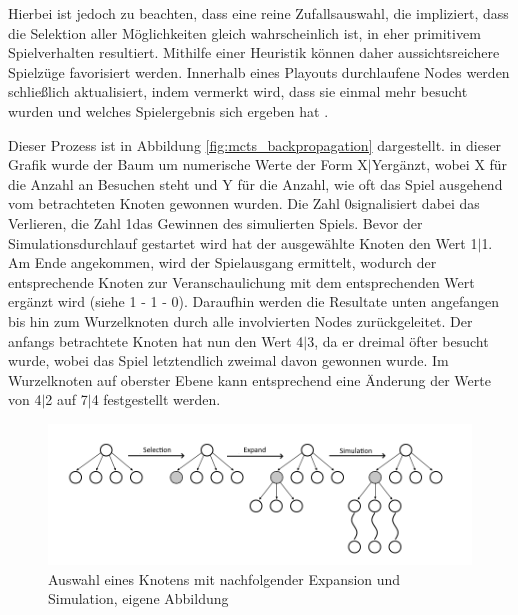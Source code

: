 \documentclass[12pt,a4paper]{article}
\begin{document}
Hierbei ist jedoch zu beachten, dass eine reine Zufallsauswahl, die impliziert, dass die Selektion aller Möglichkeiten gleich wahrscheinlich ist, in eher primitivem Spielverhalten resultiert. Mithilfe einer Heuristik können daher aussichtsreichere Spielzüge favorisiert werden. Innerhalb eines Playouts durchlaufene Nodes werden schließlich aktualisiert, indem vermerkt wird, dass sie einmal mehr besucht wurden und welches Spielergebnis sich ergeben hat \cite{Chaslot2008}.

Dieser Prozess ist in Abbildung \ref{fig:mcts_backpropagation} dargestellt. in dieser Grafik wurde der Baum um numerische Werte der Form \glqq{}X$|$Y\grqq  ergänzt, wobei X für die Anzahl an Besuchen steht und Y für die Anzahl, wie oft das Spiel ausgehend vom betrachteten Knoten gewonnen wurden. Die Zahl \glqq{}0\grqq signalisiert dabei das Verlieren, die Zahl \glqq{}1\grqq das Gewinnen des simulierten Spiels. Bevor der Simulationsdurchlauf gestartet wird hat der ausgewählte Knoten den Wert \glqq{}1$|$1\grqq{}. Am Ende angekommen, wird der Spielausgang ermittelt, wodurch der entsprechende Knoten zur Veranschaulichung mit dem entsprechenden Wert ergänzt wird (siehe \glqq{}1\grqq{} - \glqq{}1\grqq{} - \glqq{}0\grqq). Daraufhin werden die Resultate unten angefangen bis hin zum Wurzelknoten durch alle involvierten Nodes zurückgeleitet. Der anfangs betrachtete Knoten hat nun den Wert \glqq{}4$|$3\grqq{}, da er dreimal öfter besucht wurde, wobei das Spiel letztendlich zweimal davon gewonnen wurde. Im Wurzelknoten auf oberster Ebene kann entsprechend eine Änderung der Werte von \glqq{}4$|$2\grqq{} auf \glqq{}7$|$4\grqq{} festgestellt werden.

\begin{figure}
\centering
\includegraphics[width=1.0\textwidth]{pics/SelectionExpandSimulation.png}	
\caption{Auswahl eines Knotens mit nachfolgender Expansion und Simulation, eigene Abbildung}
	\label{fig:mcts_exp_sim}
\end{figure}
\end{document}
